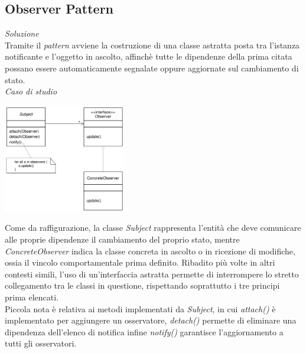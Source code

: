\documentclass{article}
\begin{document}
\subsection*{Observer Pattern}
\large
\textit{Soluzione}\\
Tramite il \textit{pattern} avviene la costruzione di una classe astratta posta tra l'istanza notificante e l'oggetto in ascolto, affinchè tutte le dipendenze della prima citata possano essere automaticamente segnalate oppure aggiornate sul cambiamento di stato.\vspace*{14pt}\\
\textit{Caso di studio}\\
\begin{center}
    \includegraphics[width=0.4\textwidth]{foto 3.png}
\end{center}
Come da raffigurazione, la classe \textit{Subject} rappresenta l'entità che deve comunicare alle proprie dipendenze il cambiamento del proprio stato, mentre \textit{ConcreteObserver} indica la classe concreta in ascolto o in ricezione di modifiche, ossia il vincolo comportamentale prima definito. Ribadito più volte in altri contesti simili, l'uso di un'interfaccia astratta permette di interrompere lo stretto collegamento tra le classi in questione, rispettando soprattutto i tre principi prima elencati.\vspace*{7pt}\\
Piccola nota è relativa ai metodi implementati da \textit{Subject}, in cui \textit{attach()} è implementato per aggiungere un osservatore, \textit{detach()} permette di eliminare una dipendenza dell'elenco di notifica infine \textit{notify()} garantisce l'aggiornamento a tutti gli osservatori. 
\end{document}
